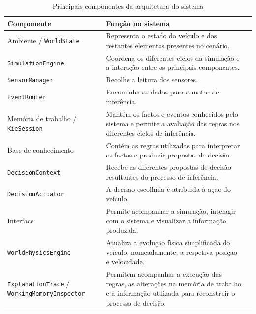 \begin{table}[H]
  \centering
  \caption{Principais componentes da arquitetura do sistema}
  \label{tab:componentes}
  \small
  \begin{tabularx}{\textwidth}{@{}L{5.4cm}VX@{}}
    \toprule
    \textbf{Componente} & \textbf{Função no sistema} \\
    \midrule
    Ambiente / \texttt{WorldState} & Representa o estado do veículo e dos
      restantes elementos presentes no cenário. \\ \linhasep
    \texttt{SimulationEngine} & Coordena os diferentes ciclos da simulação e a
      interação entre os principais componentes. \\ \linhasep
    \texttt{SensorManager} & Recolhe a leitura dos sensores. \\ \linhasep
    \texttt{EventRouter} & Encaminha os dados para o motor de inferência. \\ \linhasep
    Memória de trabalho / \texttt{KieSession} & Mantém os factos e eventos
      conhecidos pelo sistema e permite a avaliação das regras nos diferentes
      ciclos de inferência. \\ \linhasep
    Base de conhecimento & Contém as regras utilizadas para interpretar os
      factos e produzir propostas de decisão. \\ \linhasep
    \texttt{DecisionContext} & Recebe as diferentes propostas de decisão
      resultantes do processo de inferência. \\ \linhasep
    \texttt{DecisionActuator} & A decisão escolhida é atribuída à ação do
      veículo. \\ \linhasep
    Interface & Permite acompanhar a simulação, interagir com o sistema e
      visualizar a informação produzida. \\ \linhasep
    \texttt{WorldPhysicsEngine} & Atualiza a evolução física simplificada do
      veículo, nomeadamente, a respetiva posição e velocidade. \\ \linhasep
    \texttt{ExplanationTrace} / \texttt{WorkingMemoryInspector} & Permitem
      acompanhar a execução das regras, as alterações na memória de trabalho e
      a informação utilizada para reconstruir o processo de decisão. \\
    \bottomrule
  \end{tabularx}
\end{table}

